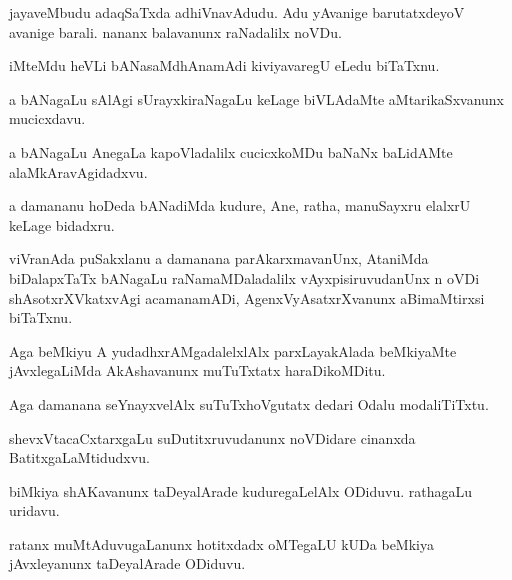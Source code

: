 \documentclass{article}
\begin{document}
\begin{mn}%
jayaveMbudu adaqSaTxda adhiVnavAdudu. Adu yAvanige barutatxdeyoV avanige barali. nananx 
balavanunx raNadalilx noVDu.
\end{mn}

\begin{mn}%
iMteMdu heVLi bANasaMdhAnamAdi kiviyavaregU eLedu biTaTxnu.
\end{mn}

\begin{mn}%
a bANagaLu sAlAgi sUrayxkiraNagaLu keLage biVLAdaMte aMtarikaSxvanunx mucicxdavu.
\end{mn}

\begin{mn}%
a bANagaLu AnegaLa kapoVladalilx cucicxkoMDu baNaNx baLidAMte alaMkAravAgidadxvu.
\end{mn}

\begin{mn}%
a damananu hoDeda bANadiMda kudure, Ane, ratha, manuSayxru elalxrU keLage bidadxru.
\end{mn}

\begin{mn}%
viVranAda puSakxlanu a damanana parAkarxmavanUnx, AtaniMda biDalapxTaTx bANagaLu 
raNamaMDaladalilx vAyxpisiruvudanUnx n oVDi shAsotxrXVkatxvAgi acamanamADi, 
AgenxVyAsatxrXvanunx aBimaMtirxsi biTaTxnu.
\end{mn}

\begin{mn}%
Aga beMkiyu A yudadhxrAMgadalelxlAlx parxLayakAlada beMkiyaMte jAvxlegaLiMda AkAshavanunx 
muTuTxtatx haraDikoMDitu.
\end{mn}

\begin{mn}%
Aga damanana seYnayxvelAlx suTuTxhoVgutatx dedari Odalu modaliTiTxtu.
\end{mn}

\begin{mn}%
shevxVtacaCxtarxgaLu suDutitxruvudanunx noVDidare cinanxda BatitxgaLaMtidudxvu.
\end{mn}

\begin{mn}%
biMkiya shAKavanunx taDeyalArade kuduregaLelAlx ODiduvu. rathagaLu uridavu.
\end{mn}

\begin{mn}%
ratanx muMtAduvugaLanunx hotitxdadx oMTegaLU kUDa beMkiya jAvxleyanunx taDeyalArade ODiduvu.
\end{mn}
\end{document}

